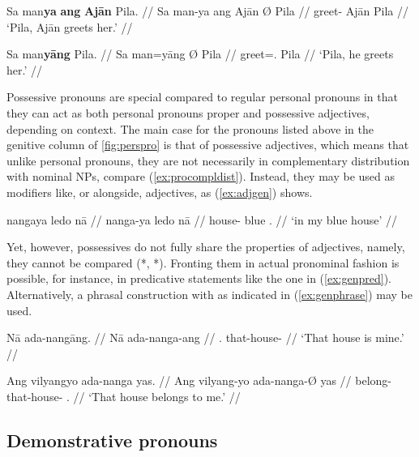 \pex
\a\begingl
	\gla Sa man\textbf{ya} \textbf{ang} \textbf{Ajān} {} Pila. //
	\glb Sa man-ya ang ​Ajān Ø ​Pila //
	\glc \PatT{} greet-\TsgM{} \Aarg{} ​Ajān \Top{} ​Pila //
	\glft `Pila, Ajān greets her.' //
\endgl

\a\begingl
	\gla Sa man\textbf{yāng} {} Pila. //
	\glb Sa man=yāng Ø ​Pila //
	\glc \PatT{} greet=\TsgM{}.\Aarg{} \Top{} Pila //
	\glft `Pila, he greets her.' //
\endgl
\xe



Possessive pronouns are special compared to regular personal pronouns in that 
they can act as both personal pronouns proper and possessive adjectives, 
depending on context. The main case for the pronouns listed above in the 
genitive column of \autoref{fig:perspro} is that of possessive adjectives, 
which means that unlike personal pronouns, they are not necessarily in 
complementary distribution with nominal NPs, compare (\ref{ex:procompldist}). 
Instead, they may be used as modifiers like, or alongside, adjectives, as 
(\ref{ex:adjgen}) shows.

\ex\label{ex:adjgen}
\begingl
	\gla nangaya ledo nā //
	\glb nanga-ya ledo nā //
	\glc house-\Loc{} blue \Fsg{}.\Gen{} //
	\glft `in my blue house' //
\endgl
\xe

Yet, however, possessives do not fully share the properties of adjectives,
namely, they cannot be compared (*,
*). Fronting them in actual pronominal fashion is
possible, for instance, in predicative statements like the one in
(\ref{ex:genpred}). Alternatively, a phrasal construction with
 as indicated in (\ref{ex:genphrase}) may be 
used.

\pex
\a\label{ex:genpred}\begingl
	\gla Nā ada-nangāng. //
	\glb Nā ada-nanga-ang //
	\glc \Fsg{}.\Gen{} that-house-\Aarg{} //
	\glft `That house is mine.' //
\endgl

\a\label{ex:genphrase}\begingl
	\gla Ang vilyangyo ada-nanga yas. //
	\glb Ang vilyang-yo ada-nanga-Ø yas //
	\glc \AgtT{} belong-\TsgN{} that-house-\Top{} \Fsg{}.\Parg{} //
	\glft `That house belongs to me.' //
\endgl
\xe


\subsection{Demonstrative pronouns}
\label{subsec:dempro}

